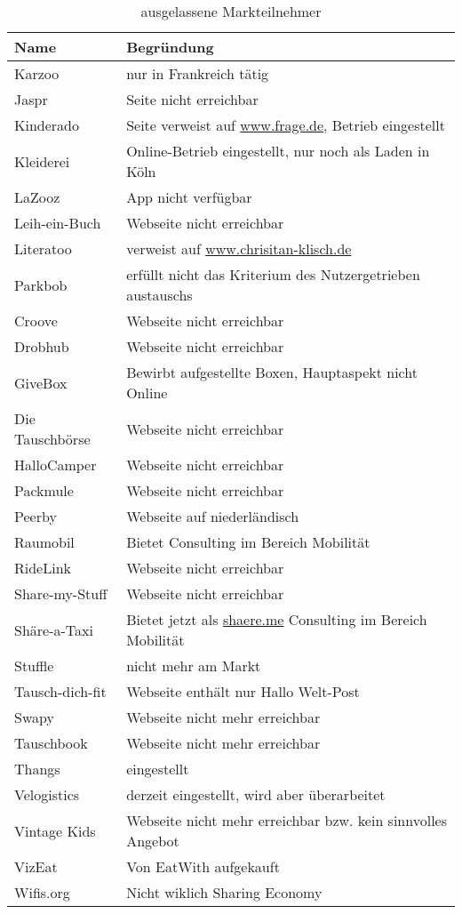 \documentclass[a4paper]{scrartcl}
\begin{document}
			\begin{table}[h]
				\begin{tabular}{ll}
					Name & Begr\"undung \\ \hline
					Karzoo & nur in Frankreich tätig \\
					Jaspr & Seite nicht erreichbar \\
					Kinderado & Seite verweist auf \url{www.frage.de}, Betrieb eingestellt\\
					Kleiderei & Online-Betrieb eingestellt, nur noch als Laden in K\"oln\\
					LaZooz & App nicht verf\"ugbar \\
					Leih-ein-Buch & Webseite nicht erreichbar\\
					Literatoo & verweist auf \url{www.chrisitan-klisch.de}\\
					Parkbob & erf\"ullt nicht das Kriterium des Nutzergetrieben austauschs\\
					Croove & Webseite nicht erreichbar\\
					Drobhub & Webseite nicht erreichbar\\
					GiveBox & Bewirbt aufgestellte Boxen, Hauptaspekt nicht Online\\
					Die Tauschb\"orse & Webseite nicht erreichbar\\
					HalloCamper & Webseite nicht erreichbar\\
					Packmule & Webseite nicht erreichbar\\
					Peerby & Webseite auf niederl\"andisch\\
					Raumobil & Bietet Consulting im Bereich Mobilit\"at\\
					RideLink & Webseite nicht erreichbar\\
					Share-my-Stuff & Webseite nicht erreichbar\\
					Sh\"are-a-Taxi & Bietet jetzt als \url{shaere.me} Consulting im Bereich Mobilit\"at\\
					Stuffle & nicht mehr am Markt\\
					Tausch-dich-fit & Webseite enth\"alt nur {\glqq Hallo Welt\grqq}-Post\\
					Swapy & Webseite nicht mehr erreichbar\\
					Tauschbook & Webseite nicht mehr erreichbar\\
					Thangs & eingestellt\\
					Velogistics & derzeit eingestellt, wird aber \"uberarbeitet\\
					Vintage Kids & Webseite nicht mehr erreichbar bzw. kein sinnvolles Angebot\\
					VizEat & Von EatWith aufgekauft\\
					Wifis.org & Nicht wiklich Sharing Economy

				\end{tabular}
				\caption{ausgelassene Markteilnehmer}
			\end{table}
\end{document}
